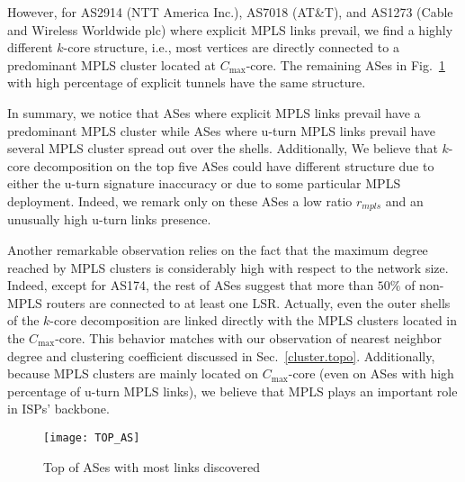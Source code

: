 However, for AS2914 (NTT America Inc.), AS7018 (AT\&T), and AS1273 (Cable and
Wireless Worldwide plc) where explicit MPLS links prevail, we find a highly
different $k$-core structure, i.e., most vertices are directly connected to a
predominant MPLS cluster located at $C_{\max}$-core. The remaining ASes in
Fig.~\ref{top_as} with high percentage of explicit tunnels have the same
structure.

In summary, we notice that ASes where explicit MPLS links prevail have a
predominant MPLS cluster while ASes where u-turn MPLS links prevail have several
MPLS cluster spread out over the shells. Additionally, We believe that $k$-core
decomposition on the top five ASes could have different structure due to either
the u-turn signature inaccuracy or due to some particular MPLS deployment.
Indeed, we remark only on these ASes a low ratio $r_{mpls}$ and an unusually 
high u-turn links presence.

Another remarkable observation relies on the fact that the maximum degree
reached by MPLS clusters is considerably high with respect to the network size.
Indeed, except for AS174, the rest of ASes suggest that more than $50\%$ of
non-MPLS routers are connected to at least one LSR. Actually, even the outer
shells of the $k$-core decomposition are linked directly with the MPLS clusters
located in the $C_{\max}$-core. This behavior matches with our observation of
nearest neighbor degree and clustering coefficient discussed in
Sec.~\ref{cluster.topo}. Additionally, because MPLS clusters are mainly located
on $C_{\max}$-core (even on ASes with high percentage of u-turn MPLS links),
we believe that MPLS plays an important role in ISPs' backbone.

\begin{figure}[!htb]
  \begin{center}
    \texttt{[image: TOP\_AS]}
  \end{center}
\vspace{-0.5cm}  
  \caption{Top of ASes with most links discovered}
  \label{top_as}
\end{figure}

